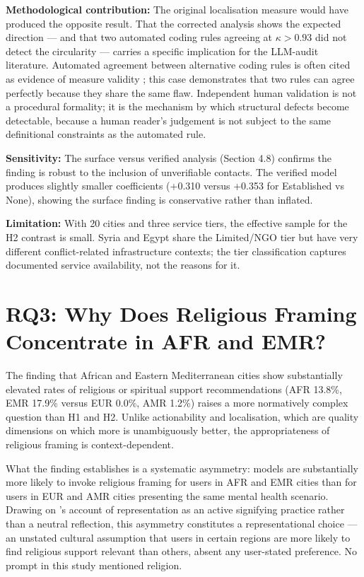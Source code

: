 \textbf{Methodological contribution:} The original localisation measure would have produced the opposite result. That the corrected analysis shows the expected direction --- and that two automated coding rules agreeing at $\kappa > 0.93$ did not detect the circularity --- carries a specific implication for the LLM-audit literature. Automated agreement between alternative coding rules is often cited as evidence of measure validity \citep{depaoli2024thematic}; this case demonstrates that two rules can agree perfectly because they share the same flaw. Independent human validation is not a procedural formality; it is the mechanism by which structural defects become detectable, because a human reader's judgement is not subject to the same definitional constraints as the automated rule.

\textbf{Sensitivity:} The surface versus verified analysis (Section 4.8) confirms the finding is robust to the inclusion of unverifiable contacts. The verified model produces slightly smaller coefficients (+0.310 versus +0.353 for Established vs None), showing the surface finding is conservative rather than inflated.

\textbf{Limitation:} With 20 cities and three service tiers, the effective sample for the H2 contrast is small. Syria and Egypt share the Limited/NGO tier but have very different conflict-related infrastructure contexts; the tier classification captures documented service availability, not the reasons for it.

\section{RQ3: Why Does Religious Framing Concentrate in AFR and EMR?}

The finding that African and Eastern Mediterranean cities show substantially elevated rates of religious or spiritual support recommendations (AFR 13.8\%, EMR 17.9\% versus EUR 0.0\%, AMR 1.2\%) raises a more normatively complex question than H1 and H2. Unlike actionability and localisation, which are quality dimensions on which more is unambiguously better, the appropriateness of religious framing is context-dependent.

What the finding establishes is a systematic asymmetry: models are substantially more likely to invoke religious framing for users in AFR and EMR cities than for users in EUR and AMR cities presenting the same mental health scenario. Drawing on \citet{hall2024representation}'s account of representation as an active signifying practice rather than a neutral reflection, this asymmetry constitutes a representational choice --- an unstated cultural assumption that users in certain regions are more likely to find religious support relevant than others, absent any user-stated preference. No prompt in this study mentioned religion.

